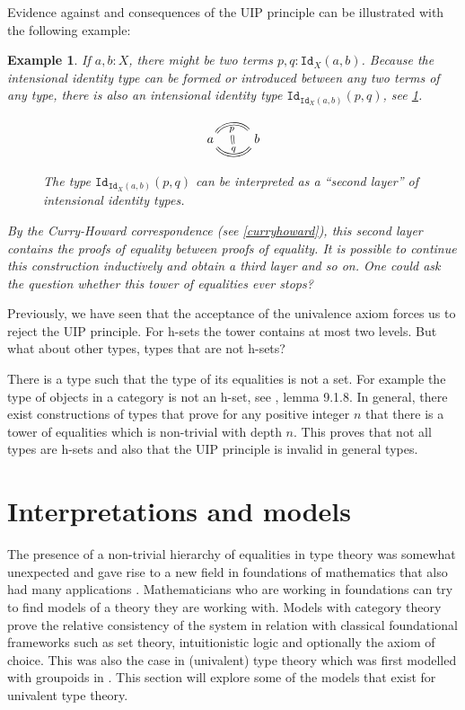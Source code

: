 \documentclass[12pt,a4paper,twoside,xetex]{book}
\newtheorem{example}[theorem]{Example}
\newcommand{\op}[1]{\mathtt{#1}}
\begin{document}
Evidence against and consequences of the UIP principle can be illustrated with the following example:

\begin{example}\label{stackedeqs}
If $a,b:X$, there might be two terms $p,q:\op{Id}_X(a,b)$. Because the intensional identity type can be formed or introduced between any two terms of any type, there is also an intensional identity type $\op{Id}_{\op{Id}_X(a,b)}(p,q)$, see \cref{secondleveleq}. 


\begin{figure}\label{secondleveleq}
 \centering
 
\[ \begin{tikzcd}
a \arrow[equal, r, bend left=50, "p"{name=U, below}]
\arrow[equal, r, bend right=50, "q"{name=D}]
& b
\arrow[equal, r, from=U, to=D]
\end{tikzcd}
\]
 \caption{The type $\op{Id}_{\op{Id}_X(a,b)}(p,q)$ can be interpreted as a ``second layer'' of intensional identity types. }
\end{figure}


By the Curry-Howard correspondence (see \cref{curryhoward}), this second layer contains the proofs of equality between proofs of equality. It is possible to continue this construction inductively and obtain a third layer and so on. One could ask the question whether this tower of equalities ever stops? 
\end{example}




Previously, we have seen that the acceptance of the univalence axiom forces us to reject the UIP principle. For h-sets the tower contains at most two levels. But what about other types, types that are not h-sets? 

There is a type such that the type of its equalities is not a set. For example the type of objects in a category is not an h-set, see \cite{Voevodsky2013}, lemma 9.1.8. In general, there exist constructions of types that prove for any positive integer $n$ that there is a tower of equalities which is non-trivial with depth $n$. This proves that not all types are h-sets and also that the UIP principle is invalid in general types. 



\chapter{Interpretations and models}

The presence of a non-trivial hierarchy of equalities in type theory was somewhat unexpected and gave rise to a new field in foundations of mathematics that also had many applications \cite{Voevodsky2013}. Mathematicians who are working in foundations can try to find models of a theory they are working with. Models with category theory prove the relative consistency of the system in relation with classical foundational frameworks such as set theory, intuitionistic logic and optionally the axiom of choice. This was also the case in (univalent) type theory which was first modelled with groupoids in \cite{Hofmann1998}. This section will explore some of the models that exist for univalent type theory.
\end{document}

